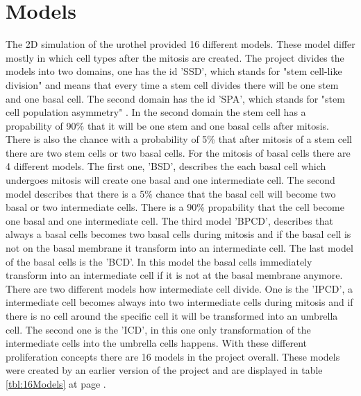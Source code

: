 \section{Models}
The 2D simulation of the urothel provided 16 different models. These model differ mostly in which cell types after the mitosis are created. The project divides the models into two domains, one has the id 'SSD', which stands for "stem cell-like division" \cite{Torelli2017} and means that every time a stem cell divides there will be one stem and one basal cell. The second domain has the id 'SPA', which stands for "stem cell population asymmetry" \cite{Torelli2017}. In the second domain the stem cell has a propability of 90\% that it will be one stem and one basal cells after mitosis. There is also the chance with a probability of 5\% that after mitosis of a stem cell there are two stem cells or two basal cells. \newline
For the mitosis of basal cells there are 4 different models. The first one, 'BSD', describes the each basal cell which undergoes mitosis will create one basal and one intermediate cell. The second model describes that there is a 5\% chance that the basal cell will become two basal or two intermediate cells. There is a 90\% propability that the cell become one basal and one intermediate cell. The third model 'BPCD', describes that always a basal cells becomes two basal cells during mitosis and if the basal cell is not on the basal membrane it transform into an intermediate cell. The last model of the basal cells is the 'BCD'. In this model the basal cells immediately transform into an intermediate cell if it is not at the basal membrane anymore.\newline
There are two different models how intermediate cell divide. One is the 'IPCD', a intermediate cell becomes always into two intermediate cells during mitosis and if there is no cell around the specific cell it will be transformed into an umbrella cell. The second one is the 'ICD', in this one only transformation of the intermediate cells into the umbrella cells happens. \newline
With these different proliferation concepts there are 16 models in the project overall. These models were created by an earlier version of the project \cite{Torelli2017} and are displayed in table \ref{tbl:16Models} at page \pageref{tbl:16Models}.


